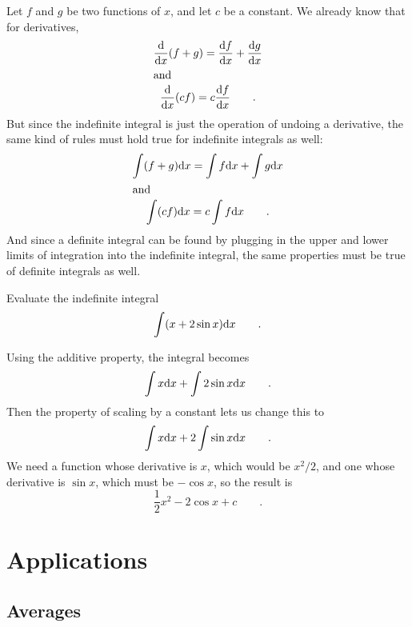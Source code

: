 Let $f$ and $g$ be two functions of $x$, and let $c$ be a constant. We already know that for derivatives,
\begin{gather*}
  \frac{\textup{d}}{\textup{d} x}(f+g) = \frac{\textup{d} f}{\textup{d} x} + \frac{\textup{d} g}{\textup{d} x} \\
\intertext{and}
  \frac{\textup{d}}{\textup{d} x}(cf) = c\frac{\textup{d} f}{\textup{d} x} \qquad .
\end{gather*}
But since the indefinite integral is just the operation of undoing a derivative, the
same kind of rules must hold true for indefinite integrals as well:
\begin{gather*}
  \int(f+g)\textup{d} x =   \int f \textup{d} x +   \int g \textup{d} x \\
\intertext{and}
  \int(cf)\textup{d} x =   c \int f \textup{d} x \qquad .
\end{gather*}
And since a definite integral can be found by plugging in the upper and lower limits of integration
into the indefinite integral, the same properties must be true of definite integrals as well.

\begin{eg}
\egquestion Evaluate the indefinite integral
\begin{equation*}
  \int (x+2\sin x) \textup{d} x \qquad .
\end{equation*}

\eganswer
Using the additive property, the integral becomes
\begin{equation*}
 \int x \textup{d} x +   \int 2\sin x \textup{d} x \qquad .
\end{equation*}
Then the property of scaling by a constant lets us change this to
\begin{equation*}
                             \int x \textup{d} x +   2 \int \sin x \textup{d} x \qquad .\\
\end{equation*}
We need a function whose derivative is $x$, which would be $x^2/2$, and
one whose derivative is $\sin x$, which must be $-\cos x$, so the result is
\begin{equation*}
                             \frac{1}{2}x^2 -   2 \cos x + c \qquad .
\end{equation*}
\end{eg}

\section{Applications}

\subsection{Averages}

